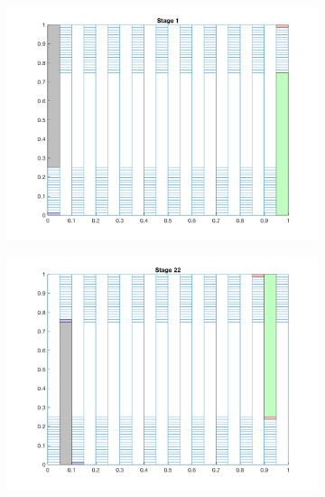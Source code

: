 \documentclass[letterpaper]{mandc2019}
\begin{document}
\begin{figure}[H]
  \centering
  \begin{subfigure}{0.49\textwidth}
  \includegraphics[scale=0.5]{figures/worst_partition_1.png}
  \end{subfigure}
  \begin{subfigure}{0.49\textwidth}
  \includegraphics[scale=0.5]{figures/worst_partition_2.png}
  \end{subfigure}
  \begin{subfigure}{0.49\textwidth}

\end{subfigure}
\end{figure}
\end{document}
